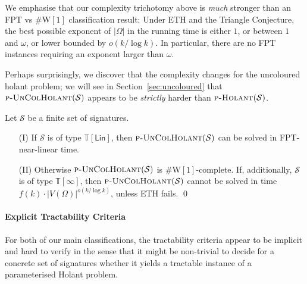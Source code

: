 \documentclass[authorcolumns,numberwithinsect]{no-lipics-v2022}
\newcommand{\W}{\mathrm{W}}
\begin{document}
We emphasise that our complexity trichotomy above is \emph{much} stronger than an FPT vs $\#\W[1]$ classification result: Under ETH and the Triangle Conjecture, the best possible exponent of $|\Omega|$ in the running time is either $1$, or between $1$ and $\omega$, or lower bounded by $o(k/\log k)$. In particular, there are no FPT instances requiring an exponent larger than $\omega$.



Perhaps surprisingly, we discover that the complexity changes for the uncoloured holant problem; we will see in Section~\ref{sec:uncoloured} that $\text{\sc{p-UnColHolant}}(\mathcal{S})$ appears to be \emph{strictly} harder than $\textsc{p-Holant}(\mathcal{S})$.

\begin{mtheorem}\label{thm:main_uncol}
    Let $\mathcal{S}$ be a finite set of signatures. 
    \begin{itemize}
        \item[(I)] If $\mathcal{S}$ is of type $\mathbb{T}[\mathsf{Lin}]$, then $\text{\sc{p-UnColHolant}}(\mathcal{S})$ can be solved in FPT-near-linear time.
        \item[(II)] Otherwise $\text{\sc{p-UnColHolant}}(\mathcal{S})$ is $\#\W[1]$-complete. If, additionally, $\mathcal{S}$ is of type $\mathbb{T}[\infty]$, then $\text{\sc{p-UnColHolant}}(\mathcal{S})$ cannot be solved in time $f(k)\cdot |V(\Omega)|^{o(k/\log k)}$, unless ETH fails. \qed
    \end{itemize}
\end{mtheorem}


\paragraph*{Explicit Tractability Criteria}
For both of our main classifications, the tractability criteria appear to be implicit and hard to verify in the sense that it might be non-trivial to decide for a concrete set of signatures whether it yields a tractable instance of a parameterised Holant problem.
\end{document}
